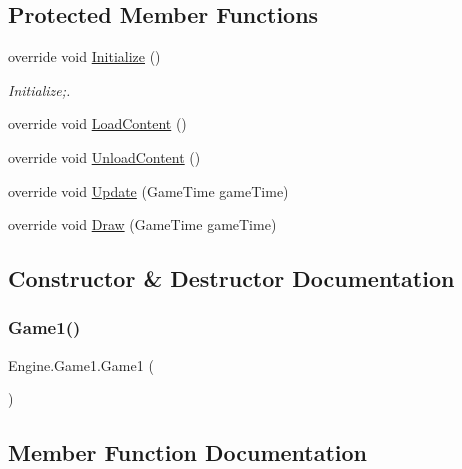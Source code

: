 \subsection*{Protected Member Functions}
\begin{DoxyCompactItemize}
\item 
override void \hyperlink{a00306_a640e4df5dfc3ea2b4dab155f3dc3152c}{Initialize} ()
\begin{DoxyCompactList}\small\item\em Initialize;. \end{DoxyCompactList}\item 
override void \hyperlink{a00306_a0c121f8c93986e79a1c402689f53d78e}{Load\+Content} ()
\item 
override void \hyperlink{a00306_a514f0c28029716a22b7e580a06fef9a0}{Unload\+Content} ()
\item 
override void \hyperlink{a00306_a5ec7bcee1272c1a62a77292cd95d043f}{Update} (Game\+Time game\+Time)
\item 
override void \hyperlink{a00306_a0d4254c27d581ec3a459cfc439a1a071}{Draw} (Game\+Time game\+Time)
\end{DoxyCompactItemize}


\subsection{Constructor \& Destructor Documentation}
\mbox{\label{a00306_a321d836485b0e6ba049e1200dee17c3b}} 
\subsubsection{\texorpdfstring{Game1()}{Game1()}}
{\footnotesize\ttfamily Engine.\+Game1.\+Game1 (\begin{DoxyParamCaption}{ }\end{DoxyParamCaption})\hspace{0.3cm}{\ttfamily [inline]}}



\subsection{Member Function Documentation}
\mbox{\label{a00306_a0d4254c27d581ec3a459cfc439a1a071}} 
